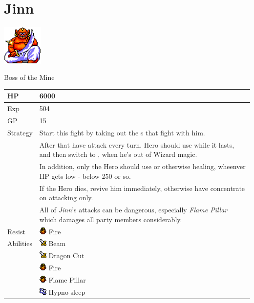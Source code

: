 \section{Jinn}
\label{monster:jinn}

\includegraphics[height=2cm,keepaspectratio]{./resources/monster/jinn}

Boss of the Mine

\begin{longtable}{ l p{9cm} }
	HP
	& 6000
\\ \hline
	Exp
	& 504
\\ \hline
	GP
	& 15
\\ \hline
	Strategy
	& Start this fight by taking out the \nameref{monster:red_bone}s that fight with him. \\
	& After that have \nameref{char:reuben} attack every turn. Hero should use \nameref{spell:thunder} while it lasts, and then switch to \nameref{spell:quake}, when he's out of Wizard magic. \\
	& In addition, only the Hero should use \nameref{spell:cure} or otherwise healing, wheenver HP gets low - below 250 or so. \\
	& If the Hero dies, revive him immediately, otherwise have \nameref{char:reuben} concentrate on attacking only. \\
	& All of \textit{Jinn}'s attacks can be dangerous, especially \textit{Flame Pillar} which damages all party members considerably.
\\ \hline
	Resist
	& \includegraphics[height=1em,keepaspectratio]{./resources/effects/fire} Fire
\\ \hline
	Abilities
	& \includegraphics[height=1em,keepaspectratio]{./resources/effects/damage} Beam \\
	& \includegraphics[height=1em,keepaspectratio]{./resources/effects/damage} Dragon Cut \\
	& \includegraphics[height=1em,keepaspectratio]{./resources/effects/fire} Fire \\
	& \includegraphics[height=1em,keepaspectratio]{./resources/effects/fire} Flame Pillar \\
	& \includegraphics[height=1em,keepaspectratio]{./resources/effects/sleep} Hypno-sleep
\end{longtable}
